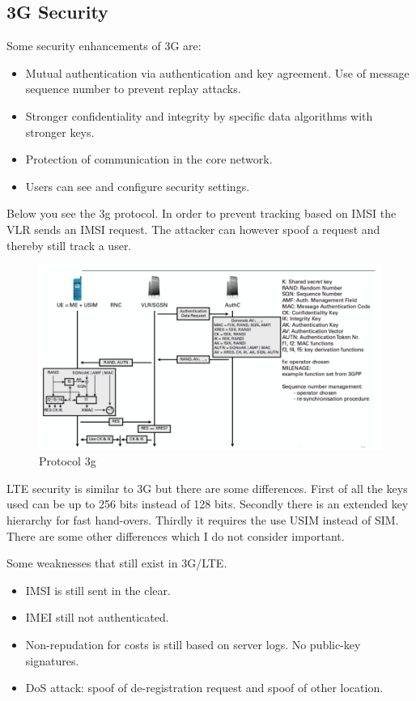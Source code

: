 \documentclass{article}
\begin{document}
\subsection*{3G Security}
Some security enhancements of 3G are: 

\begin{itemize}
\item Mutual authentication via authentication and key agreement. Use of message sequence number to prevent replay attacks.
\item Stronger confidentiality and integrity by specific data algorithms with stronger keys.
\item Protection of communication in the core network.
\item Users can see and configure security settings.
\end{itemize}

Below you see the 3g protocol. In order to prevent tracking based on IMSI the VLR sends an IMSI request. The attacker can however spoof a request and thereby still track a user. 

\begin{figure}[!h]
\centering
\includegraphics[width=\textwidth, height=\textheight, keepaspectratio]{images/3gprotocol.png}
\caption{Protocol 3g}
\label{fig:3gprotocol}
\end{figure}

LTE security is similar to 3G but there are some differences. First of all the keys used can be up to 256 bits instead of 128 bits. Secondly there is an extended key hierarchy for fast hand-overs. Thirdly it requires the use USIM instead of SIM. There are some other differences which I do not consider important.

Some weaknesses that still exist in 3G/LTE.

\begin{itemize}
\item IMSI is still sent in the clear.
\item IMEI still not authenticated.
\item Non-repudation for costs is still based on server logs. No public-key signatures.
\item DoS attack: spoof of de-registration request and spoof of other location.
\end{itemize}
\end{document}
